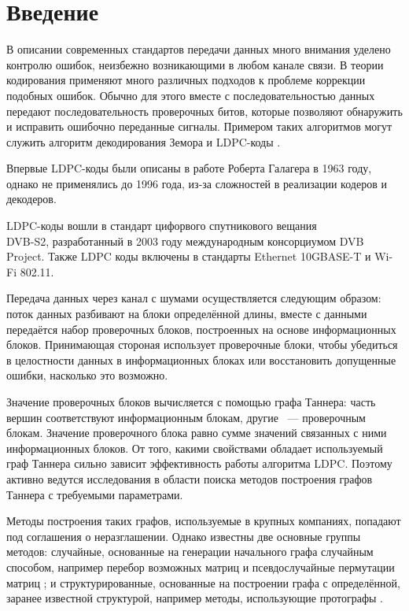 \documentclass[14pt]{mmcs-article}
\begin{document}


\renewcommand{\contentsname}{Оглавление}

\tableofcontents

\newpage

\section*{Введение}

В описании современных стандартов передачи данных много внимания уделено контролю ошибок, неизбежно возникающими в любом канале связи. В теории кодирования применяют много различных подходов к проблеме коррекции подобных ошибок. Обычно для этого вместе с последовательностью данных передают последовательность проверочных битов, которые позволяют обнаружить и исправить ошибочно переданные сигналы. Примером таких алгоритмов могут служить алгоритм декодирования Земора \cite{zemor} и LDPC-коды \cite{johnson}.

Впервые LDPC-коды были описаны в работе Роберта Галагера \cite{gallager} в 1963 году, однако не применялись до 1996 года, из-за сложностей в реализации кодеров и декодеров.

LDPC-коды вошли в стандарт цифорвого спутникового вещания\\ DVB-S2, разработанный в 2003 году международным консорциумом DVB Project. Также LDPC коды включены в стандарты Ethernet 10GBASE-T и Wi-Fi 802.11.

Передача данных через канал с шумами осуществляется следующим образом: поток данных разбивают на блоки определённой длины, вместе с данными передаётся набор проверочных блоков, построенных на основе информационных блоков. Принимающая стороная использует проверочные блоки, чтобы убедиться в целостности данных в информационных блоках или  восстановить допущенные ошибки, насколько это возможно.

Значение проверочных блоков вычисляется с помощью графа Таннера: часть вершин соответствуют информационным блокам, другие ~--- проверочным блокам. Значение проверочного блока равно сумме значений связанных с ними информационных блоков. От того, какими свойствами обладает используемый граф Таннера сильно зависит эффективность работы алгоритма LDPC. Поэтому активно ведутся исследования в области поиска методов построения графов Таннера с требуемыми параметрами.

Методы построения таких графов, используемые в крупных компаниях, попадают под соглашения о неразглашении. Однако известны две основные группы методов: случайные, основанные на генерации начального графа случайным способом, например перебор возможных матриц \cite{bruteforce} и псевдослучайные пермутации матриц \cite{gallager}; и структурированные, основанные на построении графа с определённой, заранее известной структурой, например методы, использующие протографы \cite{protographs}.
\end{document}
